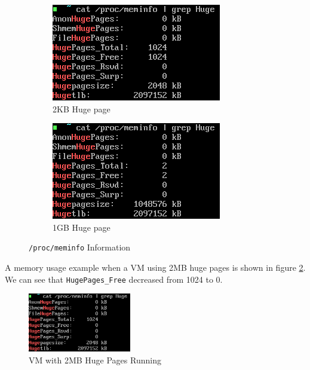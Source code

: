 \documentclass[12pt]{article}
\begin{document}
\begin{figure}[h]
	\hfill
	\begin{subfigure}[b]{0.4\textwidth}
		\centering
		\includegraphics[width=\textwidth]{fig7-1.png}
		\caption{2KB Huge page}
	\end{subfigure}
	\hfill
	\begin{subfigure}[b]{0.4\textwidth}
		\centering
		\includegraphics[width=\textwidth]{fig7-2.png}
		\caption{1GB Huge page}
	\end{subfigure}
	\hfill
	\caption{\texttt{/proc/meminfo} Information}
	\label{fig:mem}
\end{figure}

A memory usage example when a VM using 2MB huge pages is shown in figure \ref{fig:running}. We can see that \texttt{HugePages\_Free} decreased from 1024 to 0.

\begin{figure}[h]
	\centering
	\includegraphics[width=0.4\textwidth]{fig8.png}
	\caption{VM with 2MB Huge Pages Running}
	\label{fig:running}
\end{figure}
\end{document}
